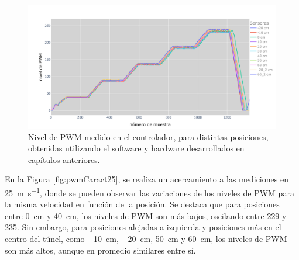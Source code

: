 \begin{figure}[H]
    \centering
    \includegraphics[width=\linewidth]{Figuras/resultados/caracterizacion/pwmCaracterizacion.png}
    \caption{Nivel de PWM medido en el controlador, para distintas posiciones, obtenidas utilizando el software y hardware desarrollados en capítulos anteriores.}
    \label{fig:pwmCaracterizacion}
\end{figure}




En la Figura \ref{fig:pwmCaract25}, se realiza un acercamiento a las mediciones en \SI{25}{\meter\per\second}, donde se pueden observar las variaciones de los niveles de PWM para la misma velocidad en función de la posición. Se destaca que para posiciones entre \SI{0}{\centi\meter} y \SI{40}{\centi\meter}, los niveles de PWM son más bajos, oscilando entre 229 y 235. Sin embargo, para posiciones alejadas a izquierda y posiciones más en el centro del túnel, como \SI{-10}{\centi\meter}, \SI{-20}{\centi\meter}, \SI{50}{\centi\meter} y \SI{60}{\centi\meter}, los niveles de PWM son más altos, aunque en promedio similares entre sí. 

